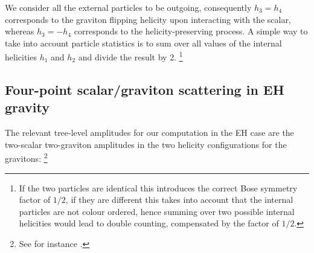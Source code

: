 \documentclass[a4paper,11pt]{article}
\numberwithin{equation}{section}
\begin{document}
We consider all the external particles to be outgoing, consequently $h_3=h_4$ corresponds to the  graviton flipping helicity upon interacting with the scalar, whereas $h_3=-h_4$ corresponds to the helicity-preserving process.
A simple way to take into account particle statistics is to sum over all values of the internal helicities $h_1$ and $h_2$ and 
divide the result by 2.%
\footnote{If the two particles are identical this introduces the correct Bose symmetry factor of $1/2$, if they are different this takes into account that the internal particles are not colour ordered, hence summing over two possible internal helicities  would lead to double counting, compensated by the factor of $1/2$.} 


\subsection{Four-point scalar/graviton scattering in EH  gravity}

The relevant tree-level amplitudes for our computation in the EH case are the two-scalar two-graviton amplitudes in the two helicity configurations for the gravitons:%
\footnote{See for instance \cite{Brandhuber:2019qpg,Nandan:2018ody}.}
\end{document}
